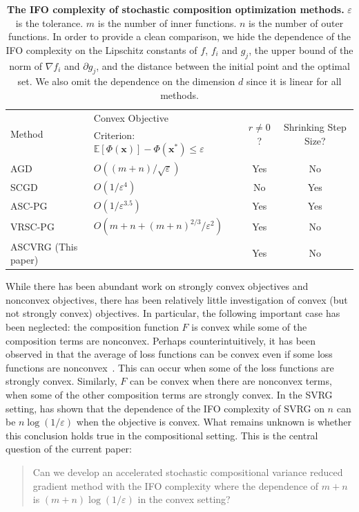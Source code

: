 \documentclass[11pt]{article}
\newcommand{\BE}{\mathbb{E}}
\newcommand{\x}{\mathbf x}
\newcommand{\red}{\color{red}}
\begin{document}
\begin{table}[t]
\caption{\textbf{The IFO complexity of stochastic composition optimization methods.} $\varepsilon$ is the tolerance. $m$ is the number of inner functions. $n$ is the number of outer functions. In order to provide a clean comparison, we hide the dependence of the IFO complexity on the Lipschitz constants of $f$, $f_i$ and $g_j$, the upper bound of the norm of $\nabla f_i$ and $\partial g_j$, and the distance between the initial point and the optimal set. We also omit the dependence on the dimension $d$ since it is linear for all methods. }\label{tab:stochastic-compostion-gradient}
\centering
\begin{tabular}{|l|l|c|c|} \hline 
\multirow{2}{*}{Method} & Convex Objective & \multirow{2}{*}{$r \neq 0$?} & \multirow{2}{*}{Shrinking Step Size?} \\
& Criterion: $\BE\left[ \Phi(\x)\right] - \Phi(\x^*) \leq \varepsilon$ & & \\ \hline  
AGD \cite{Nesterov-2013-Introductory} & $O\left((m+n)/\sqrt{\varepsilon}\right)$ & Yes & No \\ \hline
SCGD \cite{Wang-2017-Stochastic} & $O\left(1/\varepsilon^4\right)$ & No & Yes \\ \hline
ASC-PG \cite{Wang-2017-Accelerating} & $O\left(1/\varepsilon^{3.5}\right)$ & Yes & Yes \\ \hline
VRSC-PG \cite{Huo-2017-Accelerated} & $O\left(m+n+(m+n)^{2/3}/\varepsilon^2\right)$ & Yes & No \\ \hline
ASCVRG (This paper) & \red{$O\left((m{+}n)\log\left(1/\varepsilon\right)+1/\varepsilon^3\right)$} & Yes & No \\ \hline
\end{tabular}
\end{table}

While there has been abundant work on strongly convex objectives and nonconvex objectives, there has been relatively little investigation of convex (but not strongly convex) objectives. In particular, the following important case has been neglected: the composition function $F$ is convex while some of the composition terms are nonconvex. Perhaps counterintuitively, it has been observed in that the average of loss functions can be convex even if some loss functions are nonconvex~\cite{Shalev-2016-SDCA, Allen-2016-Improved}.  This can occur when some of the loss functions are strongly convex. Similarly, $F$ can be convex when there are nonconvex terms, when some of the other composition terms are strongly convex. In the SVRG setting, \cite{Allen-2016-Improved} has shown that the dependence of the IFO complexity of SVRG on $n$ can be $n\log(1/\varepsilon)$ when the objective is convex. What remains unknown is whether this conclusion holds true in the compositional setting. This is the central question of the current paper:
\begin{quote}
\textsf{Can we develop an accelerated stochastic compositional variance reduced gradient method with the IFO complexity where the dependence of $m+n$ is $(m+n)\log(1/\varepsilon)$ in the convex setting?}
\end{quote}
\end{document}
